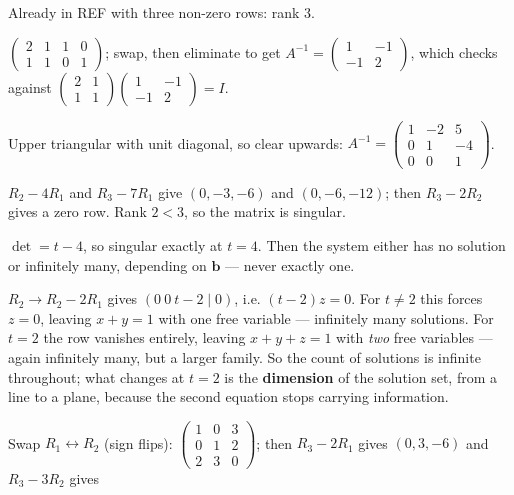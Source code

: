 \begin{solutions}
  \item Already in REF with three non-zero rows: rank $3$.
  \item $\left(\begin{array}{cc|cc}2&1&1&0\\1&1&0&1\end{array}\right)$;
        swap, then eliminate to get
        $A^{-1}=\begin{pmatrix}1&-1\\-1&2\end{pmatrix}$,
        which checks against
        $\begin{pmatrix}2&1\\1&1\end{pmatrix}
         \begin{pmatrix}1&-1\\-1&2\end{pmatrix}=I$.
  \item Upper triangular with unit diagonal, so clear upwards:
        $A^{-1}=\begin{pmatrix}1&-2&5\\0&1&-4\\0&0&1\end{pmatrix}$.
  \item $R_{2}-4R_{1}$ and $R_{3}-7R_{1}$ give $(0,-3,-6)$ and
        $(0,-6,-12)$; then $R_{3}-2R_{2}$ gives a zero row. Rank $2<3$, so
        the matrix is singular.
  \item $\det=t-4$, so singular exactly at $t=4$. Then the system either
        has no solution or infinitely many, depending on
        $\mathbf{b}$ --- never exactly one.
  \item $R_{2}\to R_{2}-2R_{1}$ gives $(0\ 0\ t-2\mid 0)$, i.e.
        $(t-2)z=0$. For $t\neq2$ this forces $z=0$, leaving $x+y=1$ with
        one free variable --- infinitely many solutions. For $t=2$ the row
        vanishes entirely, leaving $x+y+z=1$ with \emph{two} free
        variables --- again infinitely many, but a larger family. So the
        count of solutions is infinite throughout; what changes at $t=2$ is
        the \textbf{dimension} of the solution set, from a line to a
        plane, because the second equation stops carrying information.
  \item Swap $R_{1}\leftrightarrow R_{2}$ (sign flips):
        $\begin{pmatrix}1&0&3\\0&1&2\\2&3&0\end{pmatrix}$; then
        $R_{3}-2R_{1}$ gives $(0,3,-6)$ and $R_{3}-3R_{2}$ gives

\end{solutions}
